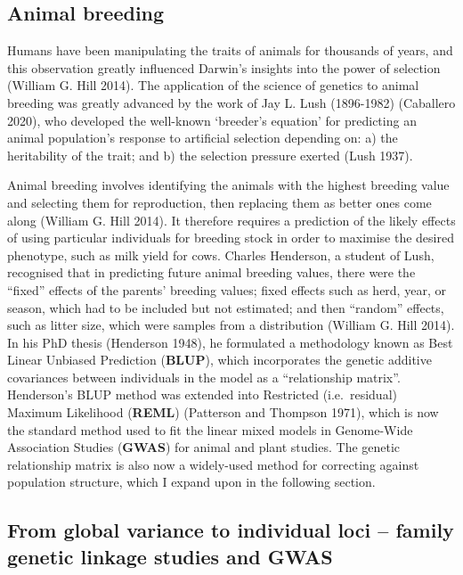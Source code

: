 \documentclass[
]{book}
\begin{document}
\hypertarget{animal-breeding}{%
\subsection{Animal breeding}\label{animal-breeding}}

Humans have been manipulating the traits of animals for thousands of years, and this observation greatly influenced Darwin's insights into the power of selection (William G. Hill 2014). The application of the science of genetics to animal breeding was greatly advanced by the work of Jay L. Lush (1896-1982) (Caballero 2020), who developed the well-known `breeder's equation' for predicting an animal population's response to artificial selection depending on: a) the heritability of the trait; and b) the selection pressure exerted (Lush 1937).

Animal breeding involves identifying the animals with the highest breeding value and selecting them for reproduction, then replacing them as better ones come along (William G. Hill 2014). It therefore requires a prediction of the likely effects of using particular individuals for breeding stock in order to maximise the desired phenotype, such as milk yield for cows. Charles Henderson, a student of Lush, recognised that in predicting future animal breeding values, there were the ``fixed'' effects of the parents' breeding values; fixed effects such as herd, year, or season, which had to be included but not estimated; and then ``random'' effects, such as litter size, which were samples from a distribution (William G. Hill 2014). In his PhD thesis (Henderson 1948), he formulated a methodology known as Best Linear Unbiased Prediction (\textbf{BLUP}), which incorporates the genetic additive covariances between individuals in the model as a ``relationship matrix''. Henderson's BLUP method was extended into Restricted (i.e.~residual) Maximum Likelihood (\textbf{REML}) (Patterson and Thompson 1971), which is now the standard method used to fit the linear mixed models in Genome-Wide Association Studies (\textbf{GWAS}) for animal and plant studies. The genetic relationship matrix is also now a widely-used method for correcting against population structure, which I expand upon in the following section.

\hypertarget{GWAS}{%
\subsection{From global variance to individual loci -- family genetic linkage studies and GWAS}\label{GWAS}}
\end{document}
